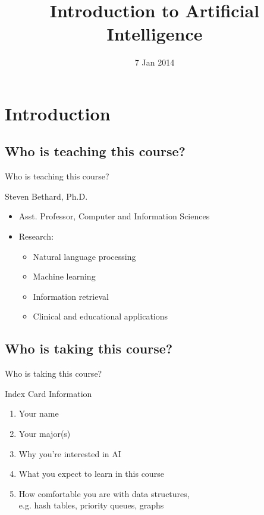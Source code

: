 \documentclass[14pt]{beamer}
\title{Introduction to Artificial Intelligence}
\date[]{7 Jan 2014}
\begin{document}
\begin{frame}
  \titlepage
\end{frame}

\section*{Introduction}

\subsection*{Who is teaching this course?}
\begin{frame}{Who is teaching this course?}
	\begin{block}{Steven Bethard, Ph.D.}
		\begin{itemize}
			\item Asst. Professor, Computer and Information Sciences
			\item Research:
				\begin{itemize}
					\item Natural language processing
					\item Machine learning
					\item Information retrieval
					\item Clinical and educational applications
				\end{itemize}
		\end{itemize}
	\end{block}
\end{frame}

\subsection*{Who is taking this course?}
\begin{frame}{Who is taking this course?}
	\begin{block}{Index Card Information}
		\begin{enumerate}
			\item Your name
			\item Your major(s)
			\item Why you're interested in AI
			\item What you expect to learn in this course
			\item How comfortable you are with data structures, \\
			      e.g. hash tables, priority queues, graphs
		\end{enumerate}
	\end{block}
\end{frame}
\end{document}
